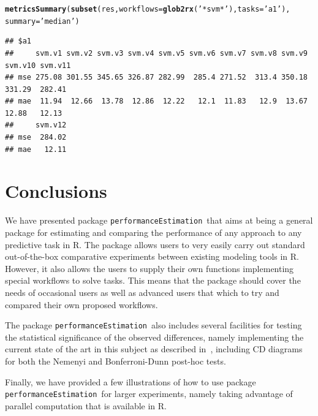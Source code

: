\documentclass[10pt,a4paper]{article}\usepackage[]{graphicx}\usepackage[]{color}
\makeatletter
\newcommand{\hlstr}[1]{\textcolor[rgb]{0.192,0.494,0.8}{#1}}%
\newcommand{\hlstd}[1]{\textcolor[rgb]{0.345,0.345,0.345}{#1}}%
\newcommand{\hlkwc}[1]{\textcolor[rgb]{0.333,0.667,0.333}{#1}}%
\newcommand{\hlkwd}[1]{\textcolor[rgb]{0.737,0.353,0.396}{\textbf{#1}}}%
\newenvironment{kframe}{%
 \def\at@end@of@kframe{}%
 \ifinner\ifhmode%
  \def\at@end@of@kframe{\end{minipage}}%
  \begin{minipage}{\columnwidth}%
 \fi\fi%
 \def\FrameCommand##1{\hskip\@totalleftmargin \hskip-\fboxsep
 \colorbox{shadecolor}{##1}\hskip-\fboxsep
     \hskip-\linewidth \hskip-\@totalleftmargin \hskip\columnwidth}%
 \MakeFramed {\advance\hsize-\width
   \@totalleftmargin\z@ \linewidth\hsize
   \@setminipage}}%
 {\par\unskip\endMakeFramed%
 \at@end@of@kframe}
\newenvironment{knitrout}{}{} %
\newcommand{\PE}{package \texttt{performanceEstimation}\ }
\makeatother
\begin{document}
\begin{knitrout}\small
{}\color{fgcolor}\begin{kframe}
\begin{alltt}
\hlkwd{metricsSummary}\hlstd{(}\hlkwd{subset}\hlstd{(res,} \hlkwc{workflows}\hlstd{=}\hlkwd{glob2rx}\hlstd{(}\hlstr{'*svm*'}\hlstd{),} \hlkwc{tasks}\hlstd{=}\hlstr{'a1'}\hlstd{),}
               \hlkwc{summary}\hlstd{=}\hlstr{'median'}\hlstd{)}
\end{alltt}
\begin{verbatim}
## $a1
##     svm.v1 svm.v2 svm.v3 svm.v4 svm.v5 svm.v6 svm.v7 svm.v8 svm.v9 svm.v10 svm.v11
## mse 275.08 301.55 345.65 326.87 282.99  285.4 271.52  313.4 350.18  331.29  282.41
## mae  11.94  12.66  13.78  12.86  12.22   12.1  11.83   12.9  13.67   12.88   12.13
##     svm.v12
## mse  284.02
## mae   12.11
\end{verbatim}
\end{kframe}
\end{knitrout}

\section{Conclusions}

We have presented \PE that aims at being a general package for estimating and comparing the performance of any approach to any predictive task in R. The package allows users to very easily carry out standard out-of-the-box comparative experiments between existing modeling tools in R. However, it also allows the users to supply their own functions implementing special workflows to solve tasks. This means that the package should cover the needs of occasional users as well as advanced users that which to try and compared their own proposed workflows.

The \PE also includes several facilities for testing the statistical significance of the observed differences, namely implementing the current state of the art in this subject as described in~\cite{Dem06}, including CD diagrams for both the Nemenyi and Bonferroni-Dunn post-hoc tests.

Finally, we have provided a few illustrations of how to use \PE for larger experiments, namely taking advantage of parallel computation that is available in R.



\end{document}
